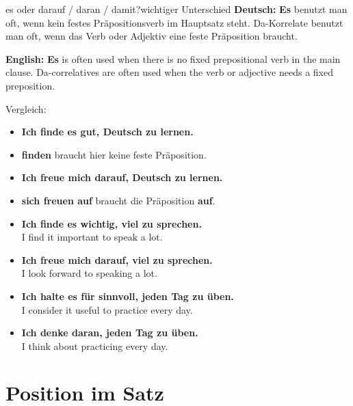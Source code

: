\documentclass[a4paper,11pt]{article}
\newcommand{\GermanText}[1]{\textbf{Deutsch: }#1\par}
\newcommand{\EnglishText}[1]{{\small\color{SoftGray}\textbf{English: }#1\par}}
\newcommand{\ExampleItem}[2]{\item \textbf{#1}\\{\small\color{SoftGray}#2}}
\begin{document}
        \begin{grammarentry}{es oder darauf / daran / damit?}{wichtiger Unterschied}
            \GermanText{\textbf{Es} benutzt man oft, wenn kein festes Präpositionsverb im Hauptsatz steht. Da-Korrelate benutzt man oft, wenn das Verb oder Adjektiv eine feste Präposition braucht.}
            \EnglishText{\textbf{Es} is often used when there is no fixed prepositional verb in the main clause. Da-correlatives are often used when the verb or adjective needs a fixed preposition.}
            
            Vergleich:
            \begin{itemize}
                \item \textbf{Ich finde es gut, Deutsch zu lernen.}
                \item \textbf{finden} braucht hier keine feste Präposition.
                \item \textbf{Ich freue mich darauf, Deutsch zu lernen.}
                \item \textbf{sich freuen auf} braucht die Präposition \textbf{auf}.
            \end{itemize}
        \end{grammarentry}
        
        \begin{exbox}
            \begin{itemize}
                \ExampleItem{Ich finde es wichtig, viel zu sprechen.}{I find it important to speak a lot.}
                \ExampleItem{Ich freue mich darauf, viel zu sprechen.}{I look forward to speaking a lot.}
                \ExampleItem{Ich halte es für sinnvoll, jeden Tag zu üben.}{I consider it useful to practice every day.}
                \ExampleItem{Ich denke daran, jeden Tag zu üben.}{I think about practicing every day.}
            \end{itemize}
        \end{exbox}
    
    
    \section{Position im Satz}
        
\end{document}
